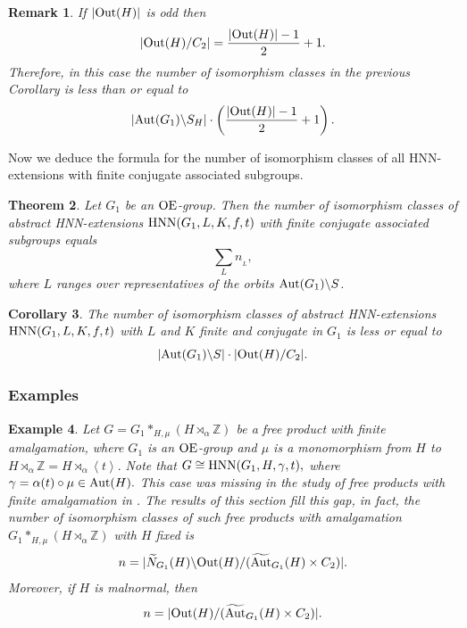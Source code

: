\documentclass[a4paper,12pt]{article}
\newtheorem{thm}{Theorem}[section]
\newtheorem{cor}[thm]{Corollary}
\newcommand{\Z}{\mathbb{Z}}
\def\OE{{\rm OE}}
\def\aut {{\rm Aut}}
\def\out {{\rm Out}}
\def\hnn {{\rm HNN}}
\def\Z{{\mathbb Z}}
\newtheorem{exa}[thm]{Example}
\newtheorem{rem}[thm]{Remark}
\begin{document}
{ \begin{rem} If $|\out(H)|$ is odd then  $$| \out(H)/ C_2|=\frac{|\out(H)|-1}{2} + 1.$$ Therefore, in this case the number of isomorphism classes in the previous Corollary is less than or equal to $$|\aut(G_1)\backslash S_H| \cdot \left( \frac{|\out(H)|-1}{2} + 1\right).$$
\end{rem}




Now we deduce the formula for the number of isomorphism classes of all HNN-extensions with finite conjugate associated subgroups.

\begin{thm} Let $G_1$ be an $\OE$-group. Then the number of isomorphism classes of abstract HNN-extensions $\hnn(G_1, L, K, f, t)$ with finite conjugate associated subgroups  equals $$\sum_{L} n_{_{L}},$$ where $L$ ranges over representatives of the orbits  $\aut(G_1)\backslash S$.
\end{thm}

\begin{cor} The number of isomorphism classes of abstract HNN-extensions $\hnn(G_1, L, K, f, t)$ with $L$ and $K$ finite and conjugate  in $G_1$  is less or  equal to $$|\aut(G_1)\backslash {S}| \cdot |\out(H)/C_2|.$$
\end{cor}

\subsubsection{Examples}


\begin{exa} Let $G= G_1*_{H, \mu} (H\rtimes_{\alpha} \Z)$ be a free product with finite amalgamation, where $G_1$ is an $\OE$-group and  $\mu$ is a monomorphism from $H$ to $H\rtimes_{\alpha} \Z= H\rtimes_{\alpha} \left\langle t \right\rangle.$ Note that $G\cong \hnn(G_1, H, \gamma, t),$ where $\gamma = \alpha(t)\circ \mu \in \aut(H).$ This case was missing in the study of free products with finite amalgamation in \cite{BPZ2}. The results of this section fill this gap, in fact, the number of  isomorphism classes of such free products with amalgamation $ G_1*_{H, \mu} (H\rtimes_{\alpha} \Z)$  with $H$ fixed is 
$$n=| \widetilde{N}_{G_1}(H) \backslash \out(H)/ ( \widetilde{\aut}_{G_1}(H) \times C_2) |.$$
Moreover, if $H$ is malnormal, then 
$$n=| \out(H)/ ( \widetilde{\aut}_{G_1}(H) \times C_2) |.$$
\end{exa}





}
\end{document}

